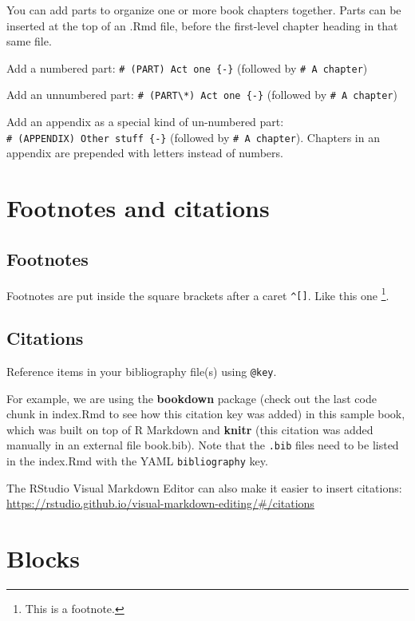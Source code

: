 \documentclass[
]{book}
\theoremstyle{definition}
\theoremstyle{definition}
\theoremstyle{definition}
\theoremstyle{definition}
\theoremstyle{remark}
\begin{document}
You can add parts to organize one or more book chapters together. Parts can be inserted at the top of an .Rmd file, before the first-level chapter heading in that same file.

Add a numbered part: \texttt{\#\ (PART)\ Act\ one\ \{-\}} (followed by \texttt{\#\ A\ chapter})

Add an unnumbered part: \texttt{\#\ (PART\textbackslash{}*)\ Act\ one\ \{-\}} (followed by \texttt{\#\ A\ chapter})

Add an appendix as a special kind of un-numbered part: \texttt{\#\ (APPENDIX)\ Other\ stuff\ \{-\}} (followed by \texttt{\#\ A\ chapter}). Chapters in an appendix are prepended with letters instead of numbers.

\hypertarget{footnotes-and-citations}{%
\chapter{Footnotes and citations}\label{footnotes-and-citations}}

\hypertarget{footnotes}{%
\section{Footnotes}\label{footnotes}}

Footnotes are put inside the square brackets after a caret \texttt{\^{}{[}{]}}. Like this one \footnote{This is a footnote.}.

\hypertarget{citations}{%
\section{Citations}\label{citations}}

Reference items in your bibliography file(s) using \texttt{@key}.

For example, we are using the \textbf{bookdown} package \citep{R-bookdown} (check out the last code chunk in index.Rmd to see how this citation key was added) in this sample book, which was built on top of R Markdown and \textbf{knitr} \citep{xie2015} (this citation was added manually in an external file book.bib).
Note that the \texttt{.bib} files need to be listed in the index.Rmd with the YAML \texttt{bibliography} key.

The RStudio Visual Markdown Editor can also make it easier to insert citations: \url{https://rstudio.github.io/visual-markdown-editing/\#/citations}

\hypertarget{blocks}{%
\chapter{Blocks}\label{blocks}}
\end{document}
